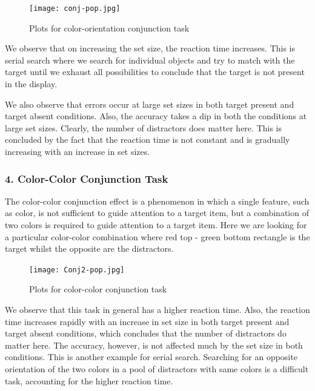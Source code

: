 \documentclass{report}
\begin{document}
\begin{figure}[htbp]  
  \centering 
  \texttt{[image: conj-pop.jpg]} 
  \caption{Plots for color-orientation conjunction task}
  \label{fig: color-orientation conjunction} 
\end{figure}

We observe that on increasing the set size, the reaction time increases. 
This is serial search where we search for individual objects and try to 
match with the target until we exhaust all possibilities to conclude 
that the target is not present in the display. 

We also observe that errors occur at large set sizes in both target 
present and target absent conditions. Also, the accuracy takes a dip 
in both the conditions at large set sizes. Clearly, the number of 
distractors does matter here. This is concluded by the fact that 
the reaction time is not constant and is gradually increasing with 
an increase in set sizes.






\subsubsection{4. Color-Color Conjunction Task}

The color-color conjunction effect is a phenomenon in which a 
single feature, such as color, is not sufficient to guide attention 
to a target item, but a combination of two colors is required to 
guide attention to a target item. Here we are looking for a 
particular color-color combination where red top - green bottom 
rectangle is the target whilst the opposite are the distractors.

\begin{figure}[htbp]  
  \centering 
  \texttt{[image: Conj2-pop.jpg]} 
  \caption{Plots for color-color conjunction task}
  \label{fig: color-color conjunction} 
\end{figure}

We observe that this task in general has a higher reaction time. 
Also, the reaction time increases rapidly with an increase in set 
size in both target present and target absent conditions, which 
concludes that the number of distractors do matter here. 
The accuracy, however, is not affected much by the set size 
in both conditions. This is another example for serial search. 
Searching for an opposite orientation of the two colors in a pool 
of distractors with same colors is a difficult task, accounting for 
the higher reaction time.
\end{document}
